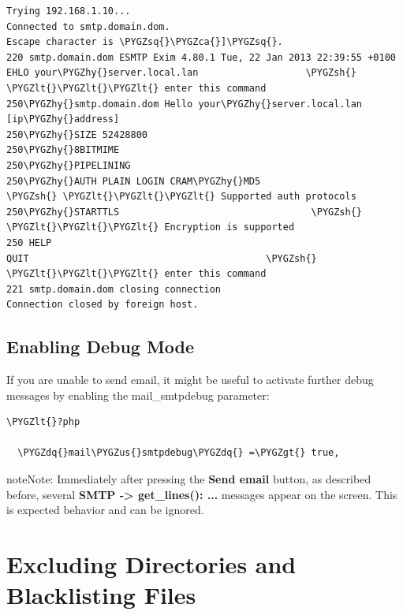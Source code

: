 \documentclass[letterpaper,10pt,english]{sphinxmanual}
\def\PYGZus{\char`\_}
\def\PYGZca{\char`\^}
\def\PYGZlt{\char`\<}
\def\PYGZgt{\char`\>}
\def\PYGZsh{\char`\#}
\def\PYGZhy{\char`\-}
\def\PYGZsq{\char`\'}
\def\PYGZdq{\char`\"}
\renewcommand\PYGZsq{\textquotesingle}
\begin{document}
\begin{Verbatim}[commandchars=\\\{\}]
Trying 192.168.1.10...
Connected to smtp.domain.dom.
Escape character is \PYGZsq{}\PYGZca{}]\PYGZsq{}.
220 smtp.domain.dom ESMTP Exim 4.80.1 Tue, 22 Jan 2013 22:39:55 +0100
EHLO your\PYGZhy{}server.local.lan                   \PYGZsh{} \PYGZlt{}\PYGZlt{}\PYGZlt{} enter this command
250\PYGZhy{}smtp.domain.dom Hello your\PYGZhy{}server.local.lan [ip\PYGZhy{}address]
250\PYGZhy{}SIZE 52428800
250\PYGZhy{}8BITMIME
250\PYGZhy{}PIPELINING
250\PYGZhy{}AUTH PLAIN LOGIN CRAM\PYGZhy{}MD5                 \PYGZsh{} \PYGZlt{}\PYGZlt{}\PYGZlt{} Supported auth protocols
250\PYGZhy{}STARTTLS                                  \PYGZsh{} \PYGZlt{}\PYGZlt{}\PYGZlt{} Encryption is supported
250 HELP
QUIT                                          \PYGZsh{} \PYGZlt{}\PYGZlt{}\PYGZlt{} enter this command
221 smtp.domain.dom closing connection
Connection closed by foreign host.
\end{Verbatim}


\subsection{Enabling Debug Mode}
\label{configuration_server/email_configuration:enabling-debug-mode}
If you are unable to send email, it might be useful to activate further debug
messages by enabling the mail\_smtpdebug parameter:

\begin{Verbatim}[commandchars=\\\{\}]
\PYGZlt{}?php

  \PYGZdq{}mail\PYGZus{}smtpdebug\PYGZdq{} =\PYGZgt{} true,
\end{Verbatim}

\begin{notice}{note}{Note:}
Immediately after pressing the \textbf{Send email} button, as described
before, several \textbf{SMTP -\textgreater{} get\_lines(): ...} messages appear on the screen.
This is expected behavior and can be ignored.
\end{notice}


\section{Excluding Directories and Blacklisting Files}
\label{configuration_server/excluded_blacklisted_files::doc}\label{configuration_server/excluded_blacklisted_files:excluding-directories-and-blacklisting-files}
\end{document}
